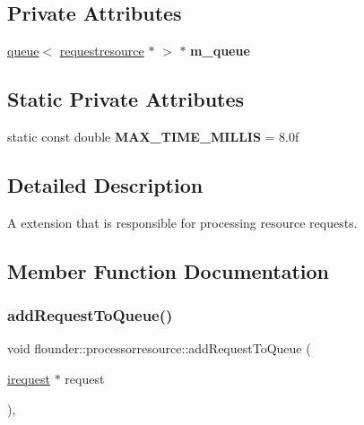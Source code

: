 \subsection*{Private Attributes}
\begin{DoxyCompactItemize}
\item 
\mbox{\label{classflounder_1_1processorresource_a4354aede707e752eba415c76f19ec104}} 
\hyperlink{classflounder_1_1queue}{queue}$<$ \hyperlink{classflounder_1_1requestresource}{requestresource} $\ast$ $>$ $\ast$ {\bfseries m\+\_\+queue}
\end{DoxyCompactItemize}
\subsection*{Static Private Attributes}
\begin{DoxyCompactItemize}
\item 
\mbox{\label{classflounder_1_1processorresource_a917c9a6b5d8f009ede0ce05b237aed09}} 
static const double {\bfseries M\+A\+X\+\_\+\+T\+I\+M\+E\+\_\+\+M\+I\+L\+L\+IS} = 8.\+0f
\end{DoxyCompactItemize}


\subsection{Detailed Description}
A extension that is responsible for processing resource requests. 



\subsection{Member Function Documentation}
\mbox{\label{classflounder_1_1processorresource_a4ae0dda615f98e93faadda22e74d61e2}} 
\subsubsection{\texorpdfstring{add\+Request\+To\+Queue()}{addRequestToQueue()}}
{\footnotesize\ttfamily void flounder\+::processorresource\+::add\+Request\+To\+Queue (\begin{DoxyParamCaption}\item[{\hyperlink{classflounder_1_1irequest}{irequest} $\ast$}]{request }\end{DoxyParamCaption})\hspace{0.3cm}{\ttfamily [override]}, {\ttfamily [virtual]}}



